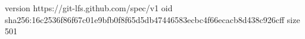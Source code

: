 version https://git-lfs.github.com/spec/v1
oid sha256:16c2536f86f67c01e9bfb0f8f65d5db47446583ecbc4f66ecacb8d438c926cff
size 501
